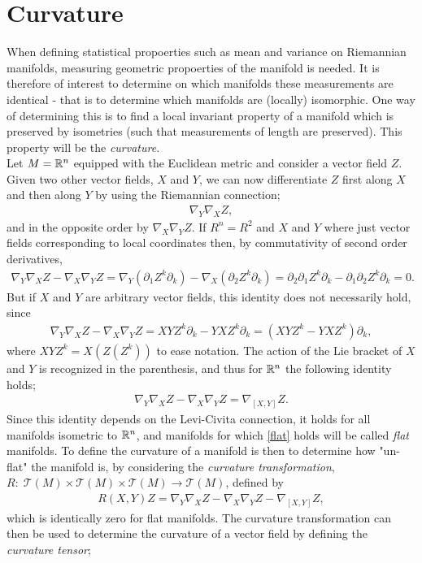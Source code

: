 \section{Curvature}

When defining statistical propoerties such as mean and variance on Riemannian manifolds, measuring geometric propoerties of the manifold is needed. It is therefore of interest to determine on which manifolds these measurements are identical - that is to determine which manifolds are (locally) isomorphic. One way of determining this is to find a local invariant property of a manifold which is preserved by isometries (such that measurements of length are preserved). This property will be the \textit{curvature}. \\[0.2 cm]

Let $M = \mathbb{R}^n$ equipped with the Euclidean metric and consider a vector field $Z$. Given two other vector fields, $X$ and $Y$, we can now differentiate $Z$ first along $X$ and then along $Y$ by using the Riemannian connection;
\begin{align*}
\nabla_Y \nabla_X Z,
\end{align*}
and in the opposite order by $\nabla_X \nabla_Y Z$. If $R^n = R^2$ and $X$ and $Y$ where just vector fields corresponding to local coordinates then, by commutativity of second order derivatives,
\begin{align*}
\nabla_Y \nabla_X Z - \nabla_X \nabla_Y Z = \nabla_Y (\partial_1 Z^k \partial_k) - \nabla_X (\partial_2 Z^k \partial_k) = \partial_2 \partial_1 Z^k \partial_k - \partial_1 \partial_2 Z^k \partial_k = 0.
\end{align*}
But if $X$ and $Y$ are arbitrary vector fields, this identity does not necessarily hold, since
\begin{align*}
\nabla_Y \nabla_X Z - \nabla_X \nabla_Y Z = XYZ^k \partial_k - YXZ^k \partial_k = (XYZ^k - YXZ^k)\partial_k,
\end{align*}
where $XYZ^k = X \left( Z \left( Z^k \right) \right)$ to ease notation. The action of the Lie bracket of $X$ and $Y$ is recognized in the parenthesis, and thus for $\mathbb{R}^n$ the following identity holds;
\begin{align}\label{flat}
\nabla_Y \nabla_X Z - \nabla_X \nabla_Y Z = \nabla_{[X,Y]} Z.
\end{align}
Since this identity depends on the Levi-Civita connection, it holds for all manifolds isometric to $\mathbb{R}^n$, and manifolds for which \ref{flat} holds will be called \textit{flat} manifolds. To define the curvature of a manifold is then to determine how "un-flat" the manifold is, by considering the \textit{curvature transformation}, $R: \; \mathcal{T}(M) \times \mathcal{T}(M) \times \mathcal{T}(M) \rightarrow \mathcal{T}(M)$, defined by
\begin{align*}
R(X,Y)Z =  \nabla_Y \nabla_X Z - \nabla_X \nabla_Y Z - \nabla_{[X,Y]} Z,
\end{align*}
which is identically zero for flat manifolds. The curvature transformation can then be used to determine the curvature of a vector field by defining the \textit{curvature tensor};

